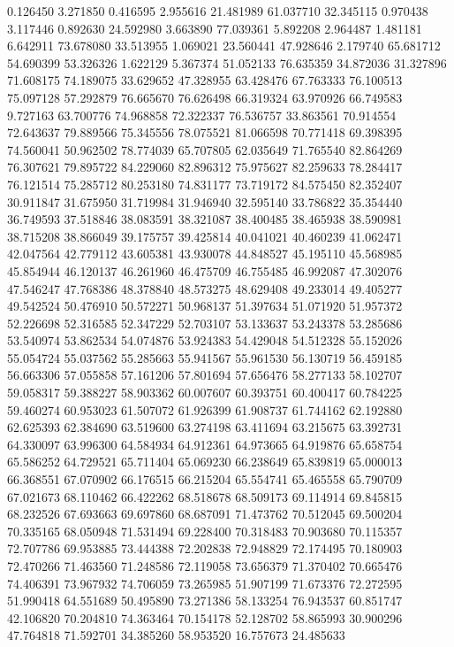 0.126450
3.271850
0.416595
2.955616
21.481989
61.037710
32.345115
0.970438
3.117446
0.892630
24.592980
3.663890
77.039361
5.892208
2.964487
1.481181
6.642911
73.678080
33.513955
1.069021
23.560441
47.928646
2.179740
65.681712
54.690399
53.326326
1.622129
5.367374
51.052133
76.635359
34.872036
31.327896
71.608175
74.189075
33.629652
47.328955
63.428476
67.763333
76.100513
75.097128
57.292879
76.665670
76.626498
66.319324
63.970926
66.749583
9.727163
63.700776
74.968858
72.322337
76.536757
33.863561
70.914554
72.643637
79.889566
75.345556
78.075521
81.066598
70.771418
69.398395
74.560041
50.962502
78.774039
65.707805
62.035649
71.765540
82.864269
76.307621
79.895722
84.229060
82.896312
75.975627
82.259633
78.284417
76.121514
75.285712
80.253180
74.831177
73.719172
84.575450
82.352407
30.911847
31.675950
31.719984
31.946940
32.595140
33.786822
35.354440
36.749593
37.518846
38.083591
38.321087
38.400485
38.465938
38.590981
38.715208
38.866049
39.175757
39.425814
40.041021
40.460239
41.062471
42.047564
42.779112
43.605381
43.930078
44.848527
45.195110
45.568985
45.854944
46.120137
46.261960
46.475709
46.755485
46.992087
47.302076
47.546247
47.768386
48.378840
48.573275
48.629408
49.233014
49.405277
49.542524
50.476910
50.572271
50.968137
51.397634
51.071920
51.957372
52.226698
52.316585
52.347229
52.703107
53.133637
53.243378
53.285686
53.540974
53.862534
54.074876
53.924383
54.429048
54.512328
55.152026
55.054724
55.037562
55.285663
55.941567
55.961530
56.130719
56.459185
56.663306
57.055858
57.161206
57.801694
57.656476
58.277133
58.102707
59.058317
59.388227
58.903362
60.007607
60.393751
60.400417
60.784225
59.460274
60.953023
61.507072
61.926399
61.908737
61.744162
62.192880
62.625393
62.384690
63.519600
63.274198
63.411694
63.215675
63.392731
64.330097
63.996300
64.584934
64.912361
64.973665
64.919876
65.658754
65.586252
64.729521
65.711404
65.069230
66.238649
65.839819
65.000013
66.368551
67.070902
66.176515
66.215204
65.554741
65.465558
65.790709
67.021673
68.110462
66.422262
68.518678
68.509173
69.114914
69.845815
68.232526
67.693663
69.697860
68.687091
71.473762
70.512045
69.500204
70.335165
68.050948
71.531494
69.228400
70.318483
70.903680
70.115357
72.707786
69.953885
73.444388
72.202838
72.948829
72.174495
70.180903
72.470266
71.463560
71.248586
72.119058
73.656379
71.370402
70.665476
74.406391
73.967932
74.706059
73.265985
51.907199
71.673376
72.272595
51.990418
64.551689
50.495890
73.271386
58.133254
76.943537
60.851747
42.106820
70.204810
74.363464
70.154178
52.128702
58.865993
30.900296
47.764818
71.592701
34.385260
58.953520
16.757673
24.485633
